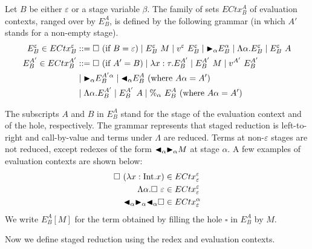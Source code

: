 \begin{definition}
  Let $B$ be either \(\varepsilon\) or a stage variable \(\beta\).
  The family of sets $ECtx^A_B$ of evaluation contexts, ranged over by $E^A_B$, is defined by the following grammar (in which $A'$ stands for a non-empty stage).
  \begin{align*}
    E^\varepsilon_B \in ECtx^\varepsilon_B & ::= \square\ (\text{if\ } B = \varepsilon)
    \mid E^\varepsilon_B\ M \mid v^\varepsilon\ E^\varepsilon_B \mid {\mathop{\blacktriangleright}}_\alpha E^\alpha_B
    \mid \Lambda\alpha.E^\varepsilon_B \mid E^\varepsilon_B\ A                                                                                    \\
    E^{A'}_B \in ECtx^{A'}_B               & ::= \square\ (\text{if } A' = B) \mid \lambda x:\tau.E^{A'}_B \mid E^{A'}_B\ M \mid v^{A'}\ E^{A'}_B \\
                                           & \mid {\mathop{\blacktriangleright}}_\alpha E^{A'\alpha}_B \mid {\mathop{\blacktriangleleft}}_\alpha E^{A}_B \ (\text{where } A\alpha = A')               \\
                                           & \mid \Lambda\alpha.E^{A'}_B \mid E^{A'}_B\ A \mid \%_\alpha\ E^{A}_B \ (\text{where } A\alpha = A')
  \end{align*}
\end{definition}

The subscripts $A$ and $B$ in $E^A_B$ stand for the stage of the evaluation
context and of the hole, respectively. The grammar represents that staged
reduction is left-to-right and call-by-value and terms under \(\Lambda\) are
reduced. Terms at non-$\varepsilon$ stages are not reduced, except
redexes of the form \({\mathop{\blacktriangleleft}}_\alpha {\mathop{\blacktriangleright}}_\alpha M\) at stage \(\alpha\).
A few examples of
evaluation contexts are shown below:
\begin{align*}
  \square\ (\lambda x:\textrm{Int}.x)                  & \in  ECtx^\varepsilon_\varepsilon \\
  \Lambda\alpha.\square\ \varepsilon            & \in ECtx^\varepsilon_\varepsilon  \\
  {\mathop{\blacktriangleleft}}_\alpha {\mathop{\blacktriangleright}}_\alpha {\mathop{\blacktriangleleft}}_\alpha \square & \in ECtx^\alpha_\varepsilon
\end{align*}
%
We write $E^A_B[M]$ for the term obtained by filling the hole $\square$ in $E^A_B$ by $M$.

Now we define staged reduction using the redex and evaluation contexts.

